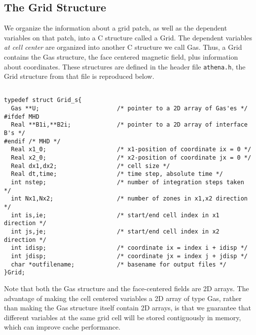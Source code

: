 
\subsection{The Grid Structure}

We organize the information about a grid patch, as well as the dependent
variables on that patch, into a C structure called a Grid.  The dependent
variables {\em at cell center} are organized into another C structure we
call Gas.  Thus, a Grid contains the Gas structure, the face centered
magnetic field, plus information about coordinates.  These structures
are defined in the header file {\tt athena.h}, the Grid structure from
that file is reproduced below.

\footnotesize
\begin{verbatim}

typedef struct Grid_s{
  Gas **U;                      /* pointer to a 2D array of Gas'es */
#ifdef MHD
  Real **B1i,**B2i;             /* pointer to a 2D array of interface B's */
#endif /* MHD */
  Real x1_0;                    /* x1-position of coordinate ix = 0 */
  Real x2_0;                    /* x2-position of coordinate jx = 0 */
  Real dx1,dx2;                 /* cell size */
  Real dt,time;                 /* time step, absolute time */
  int nstep;                    /* number of integration steps taken */
  int Nx1,Nx2;                  /* number of zones in x1,x2 direction */
  int is,ie;                    /* start/end cell index in x1 direction */
  int js,je;                    /* start/end cell index in x2 direction */
  int idisp;                    /* coordinate ix = index i + idisp */
  int jdisp;                    /* coordinate jx = index j + jdisp */
  char *outfilename;            /* basename for output files */
}Grid;

\end{verbatim}
\normalsize

Note that both the Gas structure and the face-centered fields are
2D arrays.  The advantage of making the cell centered variables a 2D
array of type Gas, rather than making the Gas structure itself contain
2D arrays, is that we guarantee that different variables at the same
grid cell will be stored contiguously in memory, which can improve cache
performance.

